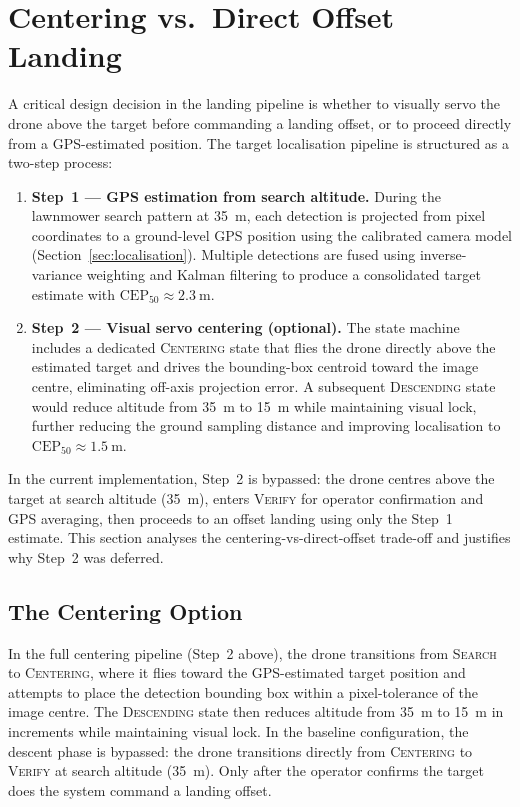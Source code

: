 \section{Centering vs.\ Direct Offset Landing}\label{sec:centering-analysis}

A critical design decision in the landing pipeline is whether to visually servo the drone above the target before commanding a landing offset, or to proceed directly from a GPS-estimated position.  The target localisation pipeline is structured as a two-step process:

\begin{enumerate}
    \item \textbf{Step~1 --- GPS estimation from search altitude.}  During the lawnmower search pattern at \SI{35}{\metre}, each detection is projected from pixel coordinates to a ground-level GPS position using the calibrated camera model (Section~\ref{sec:localisation}).  Multiple detections are fused using inverse-variance weighting and Kalman filtering to produce a consolidated target estimate with $\text{CEP}_{50} \approx \SI{2.3}{\metre}$.

    \item \textbf{Step~2 --- Visual servo centering (optional).}  The state machine includes a dedicated \textsc{Centering} state that flies the drone directly above the estimated target and drives the bounding-box centroid toward the image centre, eliminating off-axis projection error.  A subsequent \textsc{Descending} state would reduce altitude from \SI{35}{\metre} to \SI{15}{\metre} while maintaining visual lock, further reducing the ground sampling distance and improving localisation to $\text{CEP}_{50} \approx \SI{1.5}{\metre}$.
\end{enumerate}

\noindent In the current implementation, Step~2 is bypassed: the drone centres above the target at search altitude (\SI{35}{\metre}), enters \textsc{Verify} for operator confirmation and GPS averaging, then proceeds to an offset landing using only the Step~1 estimate.  This section analyses the centering-vs-direct-offset trade-off and justifies why Step~2 was deferred.

\subsection{The Centering Option}

In the full centering pipeline (Step~2 above), the drone transitions from \textsc{Search} to \textsc{Centering}, where it flies toward the GPS-estimated target position and attempts to place the detection bounding box within a pixel-tolerance of the image centre. The \textsc{Descending} state then reduces altitude from \SI{35}{\metre} to \SI{15}{\metre} in increments while maintaining visual lock. In the baseline configuration, the descent phase is bypassed: the drone transitions directly from \textsc{Centering} to \textsc{Verify} at search altitude (\SI{35}{\metre}). Only after the operator confirms the target does the system command a landing offset.

